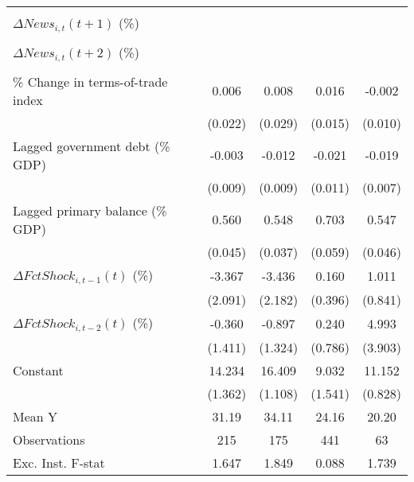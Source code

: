 {\begin{tabular}{l*{4}{c}}
                    &                     &                     &                     &                     \\
\addlinespace
$ \Delta News_{i,t}(t+1)$ (\%)&                     &                     &                     &                     \\
                    &                     &                     &                     &                     \\
\addlinespace
$ \Delta News_{i,t}(t+2)$ (\%)&                     &                     &                     &                     \\
                    &                     &                     &                     &                     \\
\addlinespace
\% Change in terms-of-trade index&       0.006         &       0.008         &       0.016         &      -0.002         \\
                    &     (0.022)         &     (0.029)         &     (0.015)         &     (0.010)         \\
\addlinespace
Lagged government debt (\% GDP)&      -0.003         &      -0.012         &      -0.021\sym{*}  &      -0.019\sym{**} \\
                    &     (0.009)         &     (0.009)         &     (0.011)         &     (0.007)         \\
\addlinespace
Lagged primary balance (\% GDP)&       0.560\sym{***}&       0.548\sym{***}&       0.703\sym{***}&       0.547\sym{***}\\
                    &     (0.045)         &     (0.037)         &     (0.059)         &     (0.046)         \\
\addlinespace
$ \Delta FctShock_{i,t-1}(t)$ (\%)&      -3.367         &      -3.436         &       0.160         &       1.011         \\
                    &     (2.091)         &     (2.182)         &     (0.396)         &     (0.841)         \\
\addlinespace
$ \Delta FctShock_{i,t-2}(t)$ (\%)&      -0.360         &      -0.897         &       0.240         &       4.993         \\
                    &     (1.411)         &     (1.324)         &     (0.786)         &     (3.903)         \\
\addlinespace
Constant            &      14.234\sym{***}&      16.409\sym{***}&       9.032\sym{***}&      11.152\sym{***}\\
                    &     (1.362)         &     (1.108)         &     (1.541)         &     (0.828)         \\
\midrule
Mean Y              &       31.19         &       34.11         &       24.16         &       20.20         \\
Observations        &         215         &         175         &         441         &          63         \\
Exc. Inst. F-stat   &       1.647         &       1.849         &       0.088         &       1.739         \\
\bottomrule
\end{tabular}
}
